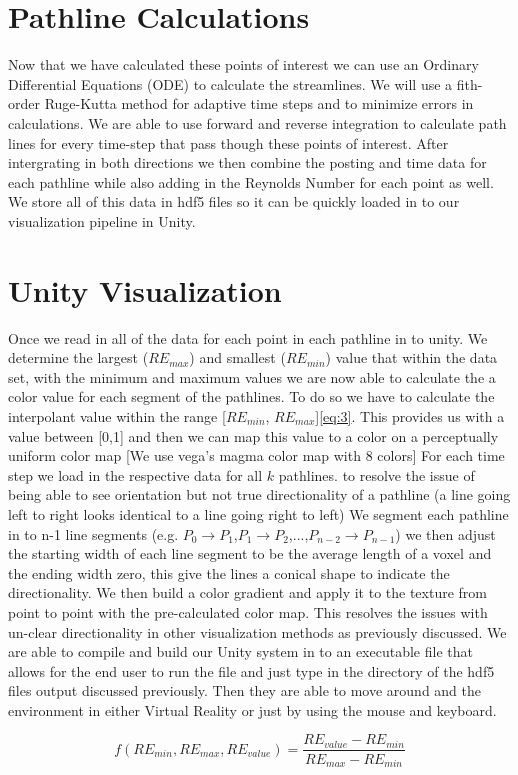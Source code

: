 \section{Pathline Calculations}


Now that we have calculated these points of interest we can use an Ordinary Differential Equations (ODE) to calculate the streamlines. We will use a fith-order Ruge-Kutta method for adaptive time steps and to minimize errors in calculations. We are able to use forward and reverse integration to calculate path lines for every time-step that pass though these points of interest. After intergrating in both directions we then combine the posting and time data for each pathline while also adding in the Reynolds Number for each point as well. We store all of this data in hdf5 files so it can be quickly loaded in to our visualization pipeline in Unity.

\section{Unity Visualization}
Once we read in all of the data for each point in each pathline in to unity. We determine the largest (\ensuremath{RE_{max}}) and smallest (\ensuremath{RE_{min}}) value that within the data set, with the minimum and maximum values we are now able to calculate the a color value for each segment of the pathlines. To do so we have to calculate the interpolant value  within the range [\ensuremath{RE_{min}}, \ensuremath{RE_{max}}]\ref{eq:3}. This provides us with a value between [0,1] and then we can map this value to a color on a  perceptually uniform color map \color{red} [We use  vega's magma color map with 8 colors] \color{black} For each time step we load in the respective data for all \ensuremath{k} pathlines. to resolve the issue of being able to see orientation but not true directionality of a pathline (a line going left to right looks identical to a line going right to left) We segment each pathline in to n-1 line segments
(e.g. \ensuremath{P_0\rightarrow P_1},\ensuremath{P_1 \rightarrow P_2},...,\ensuremath{P_{n-2} \rightarrow P_{n-1}}) 
we then adjust the starting width of each line segment to be the average length of a voxel and the ending width zero, this give the lines a conical shape to indicate the directionality. We then build a color gradient and apply it to the  texture from point to point with the pre-calculated color map. This resolves the issues with un-clear directionality in other visualization methods as previously discussed. We are able to compile and build our Unity system in to an executable file that allows for the end user to run the file and  just type in the directory of the hdf5 files output discussed previously. Then they are able to move around and the environment in either Virtual Reality or just by using the mouse and keyboard.


\begin{equation} \label{eq:3}
f(RE_{min},RE_{max},RE_{value}) = \frac{RE_{value}-RE_{min}}{RE_{max}-RE_{min}}
\end{equation} 